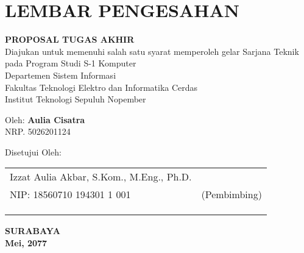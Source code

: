\chapter*{LEMBAR PENGESAHAN}

\thispagestyle{empty}

\begin{center}
  \textbf{\tatitle}
\end{center}

\begingroup
\small

\begin{center}
  \textbf{PROPOSAL TUGAS AKHIR} \\
  Diajukan untuk memenuhi salah satu syarat memperoleh gelar
  Sarjana Teknik pada
  Program Studi S-1 Komputer  \\
  Departemen Sistem Informasi \\
  Fakultas Teknologi Elektro dan Informatika Cerdas \\
  Institut Teknologi Sepuluh Nopember
\end{center}

\begin{center}
  Oleh: \textbf{Aulia Cisatra} \\
  NRP. 5026201124
\end{center}

\begin{center}
  Disetujui Oleh:
\end{center}

\vspace{10ex}

\begingroup
\setlength{\tabcolsep}{0pt}

\noindent
\begin{tabularx}{\textwidth}{X c}
  Izzat Aulia Akbar, S.Kom., M.Eng., Ph.D.       &                 \\
  NIP: 18560710 194301 1 001    & (Pembimbing)    \\
                                &                 \\
                                &                 \\
                                &                 \\
\end{tabularx}
\endgroup

\vspace{\fill}

\begin{center}
  \textbf{SURABAYA} \\
  \textbf{Mei, 2077}
\end{center}
\endgroup
